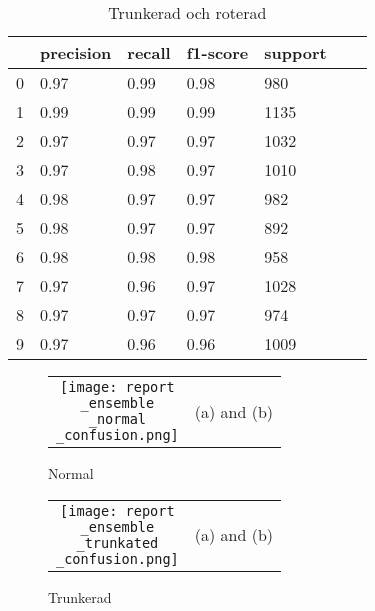 \documentclass[12pt,a4paper]{article}
\begin{document}
\begin{table}[t]
	\centering
	\footnotesize
	\caption{Trunkerad och roterad}
	\begin{tabular}{lllllll}
      \hline 
 &  precision   & recall & f1-score &  support \\
      \hline 
           0   &    0.97  &    0.99  &    0.98   &    980 \\
           1    &   0.99  &    0.99  &    0.99   &   1135 \\
           2  &     0.97   &   0.97  &    0.97   &   1032 \\
           3   &    0.97  &    0.98 &     0.97  &    1010 \\
           4   &    0.98  &    0.97  &    0.97  &     982 \\
           5  &     0.98  &    0.97  &    0.97   &    892 \\
           6  &     0.98  &    0.98   &   0.98   &    958 \\
           7   &    0.97  &    0.96  &    0.97  &    1028 \\
           8   &    0.97  &    0.97  &    0.97   &    974 \\
           9   &    0.97  &    0.96  &    0.96   &   1009 \\
           	\end{tabular}
\end{table}


\begin{figure}[t]
  \centering
  \begin{tabular}{cc}
      \texttt{[image: report\\\_ensemble\\\_normal\\\_confusion.png]} & 
      (a) and (b) \\
  \end{tabular}
  \caption{\footnotesize{Normal}}
  \label{fig:svm}
\end{figure}

\begin{figure}[t]
  \centering
  \begin{tabular}{cc}
      \texttt{[image: report\\\_ensemble\\\_trunkated\\\_confusion.png]} & 
      (a) and (b) \\
  \end{tabular}
  \caption{\footnotesize{Trunkerad}}
  \label{fig:svm}
\end{figure}
\end{document}
